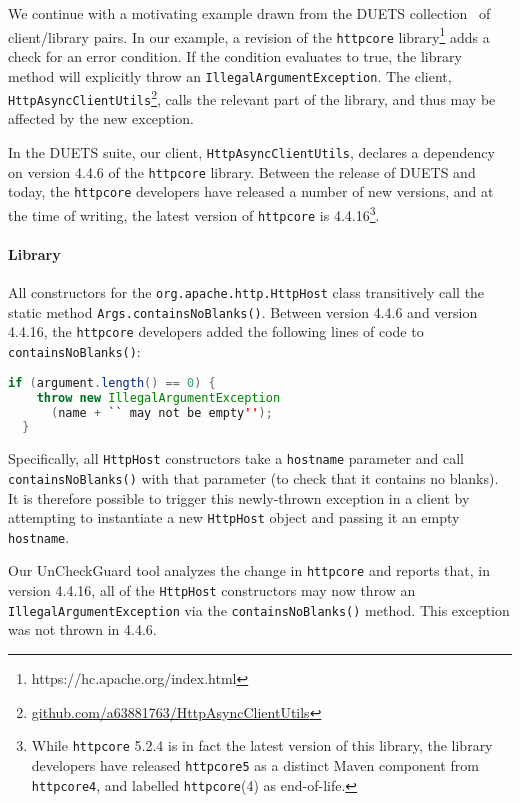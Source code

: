We continue with a motivating example drawn from the DUETS collection~\cite{durieux21:_duets}
of client/library pairs. 
In our example,
a revision of the \texttt{httpcore} library\footnote{https://hc.apache.org/index.html} adds a check for an
error condition.  If the condition evaluates to true, the library method will
explicitly throw an \texttt{IllegalArgumentException}. The client, \texttt{HttpAsyncClientUtils}\footnote{\url{github.com/a63881763/HttpAsyncClientUtils}},
calls the relevant part of the library, and thus may be affected by the new exception.

In the DUETS suite, our client, \texttt{HttpAsyncClientUtils}, declares a dependency on
version 4.4.6 of the \texttt{httpcore} library. Between the release of DUETS and today, the \texttt{httpcore} developers
have released a number of new versions, and at the time of writing, the latest version of \texttt{httpcore}
is 4.4.16\footnote{While \texttt{httpcore} 5.2.4 is in fact the latest version of this library, the library developers have released \texttt{httpcore5} as a distinct Maven component from \texttt{httpcore4}, and labelled \texttt{httpcore}(4) as end-of-life.}.

\paragraph{Library} All constructors for the \texttt{org.apache.http.HttpHost} class transitively call
the static method \texttt{Args.containsNoBlanks()}. Between version 4.4.6 and version 4.4.16, the \texttt{httpcore}
developers added the following lines of code to \texttt{containsNoBlanks()}:
\begin{lstlisting}[language=Java]
  if (argument.length() == 0) {
    throw new IllegalArgumentException
      (name + `` may not be empty'');
  }
\end{lstlisting}
Specifically, all \texttt{HttpHost} constructors take a \texttt{hostname} parameter and call \texttt{containsNoBlanks()}
with that parameter (to check that it contains no blanks). It is therefore possible to trigger this newly-thrown
exception in a client by attempting to instantiate a new \texttt{HttpHost} object and passing it an empty
\texttt{hostname}.

Our UnCheckGuard tool analyzes the change in \texttt{httpcore} and reports that, in
version 4.4.16, all of the \texttt{HttpHost} constructors may now throw an
\texttt{IllegalArgumentException} via the \texttt{containsNoBlanks()} method.
This exception was not thrown in 4.4.6.


